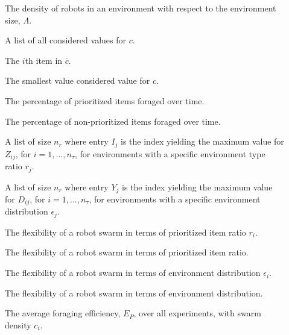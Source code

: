 \begin{description}
	\item[\parbox{\namewidth}{$c$}] The density of robots in an environment with respect to the environment size, $\Lambda$.

	\item[\parbox{\namewidth}{$\overline{c}$}] A list of all considered values for $c$.
	
	\item[\parbox{\namewidth}{$c_i$}] The $i$th item in $\overline{c}$.

	\item[\parbox{\namewidth}{$c_{min}$}] The smallest value considered value for $c$.
	
	\item[\parbox{\namewidth}{$E_P$}] The percentage of prioritized items foraged over time.

	\item[\parbox{\namewidth}{$E_{NP}$}] The percentage of non-prioritized items foraged over time.

	\item[\parbox{\namewidth}{$I$}] A list of size $n_r$ where entry $I_j$ is the index yielding the maximum value for $Z_{ij}$, for $i = 1,..., n_\tau$, for environments with a specific environment type ratio $r_j$.

	\item[\parbox{\namewidth}{$Y$}] A list of size $n_r$ where entry $Y_j$ is the index yielding the maximum value for $D_{ij}$, for $i = 1,..., n_\tau$, for environments with a specific environment distribution $\epsilon_j$.


	\item[\parbox{\namewidth}{$F_{r_i}$}] The flexibility of a robot swarm in terms of prioritized item ratio $r_i$.

	\item[\parbox{\namewidth}{$F_r$}] The flexibility of a robot swarm in terms of prioritized item ratio.

	\item[\parbox{\namewidth}{$F_{\epsilon_i}$}] The flexibility of a robot swarm in terms of environment distribution $\epsilon_i$.

	\item[\parbox{\namewidth}{$F_\epsilon$}] The flexibility of a robot swarm in terms of environment distribution.

	\item[\parbox{\namewidth}{$E_{c_i}$}] The average foraging efficiency, $E_P$, over all experiments, with swarm density $c_i$.


\end{description}
